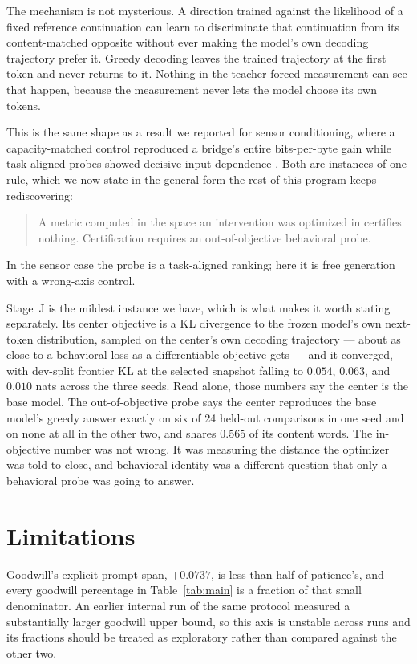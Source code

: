 \documentclass[10pt]{article}
\begin{document}
The mechanism is not mysterious. A direction trained against the likelihood of a
fixed reference continuation can learn to discriminate that continuation from
its content-matched opposite without ever making the model's own decoding
trajectory prefer it. Greedy decoding leaves the trained trajectory at the first
token and never returns to it. Nothing in the teacher-forced measurement can see
that happen, because the measurement never lets the model choose its own tokens.

This is the same shape as a result we reported for sensor conditioning, where a
capacity-matched control reproduced a bridge's entire bits-per-byte gain while
task-aligned probes showed decisive input dependence
\cite{penov2026bridges}. Both are instances of one rule, which we now state in
the general form the rest of this program keeps rediscovering:

\begin{quote}
A metric computed in the space an intervention was optimized in certifies
nothing. Certification requires an out-of-objective behavioral probe.
\end{quote}

In the sensor case the probe is a task-aligned ranking; here it is free
generation with a wrong-axis control.

Stage~J is the mildest instance we have, which is what makes it worth stating
separately. Its center objective is a KL divergence to the frozen model's own
next-token distribution, sampled on the center's own decoding trajectory ---
about as close to a behavioral loss as a differentiable objective gets --- and
it converged, with dev-split frontier KL at the selected snapshot falling to
$0.054$, $0.063$, and $0.010$ nats across the three seeds. Read alone, those
numbers say the center is the base model. The out-of-objective probe says the
center reproduces the base model's greedy answer exactly on six of 24 held-out
comparisons in one seed and on none at all in the other two, and shares $0.565$
of its content words. The in-objective number was not wrong. It was measuring
the distance the optimizer was told to close, and behavioral identity was a
different question that only a behavioral probe was going to answer.

\section{Limitations}

Goodwill's explicit-prompt span, $+0.0737$, is less than half of patience's, and
every goodwill percentage in Table~\ref{tab:main} is a fraction of that small
denominator. An earlier internal run of the same protocol measured a
substantially larger goodwill upper bound, so this axis is unstable across runs
and its fractions should be treated as exploratory rather than compared against
the other two.
\end{document}
